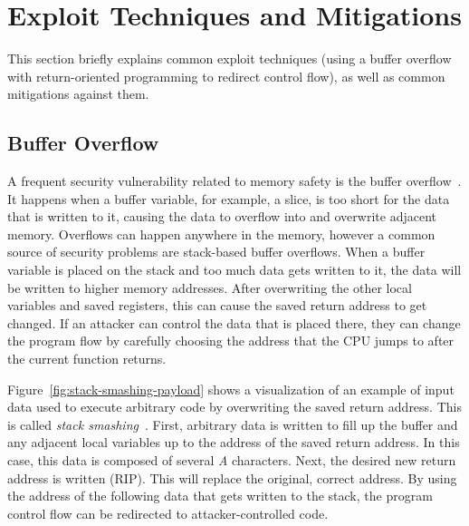 
\section{Exploit Techniques and Mitigations}\label{sec:background:exploit-techniques}

This section briefly explains common exploit techniques (using a buffer overflow with return-oriented programming to
redirect control flow), as well as common mitigations against them.



\subsection{Buffer Overflow}\label{subsec:background:exploit-techniques:buffer-overflow}

A frequent security vulnerability related to memory safety is the buffer overflow~\cite{larochelle2001}.
It happens when a buffer variable, for example, a slice, is too short for the data that is written to it, causing the
data to overflow into and overwrite adjacent memory.
Overflows can happen anywhere in the memory, however a common source of security problems are stack-based buffer
overflows.
When a buffer variable is placed on the stack and too much data gets written to it, the data will be written to higher
memory addresses.
After overwriting the other local variables and saved registers, this can cause the saved return address to get changed.
If an attacker can control the data that is placed there, they can change the program flow by carefully choosing the
address that the CPU jumps to after the current function returns.

Figure~\ref{fig:stack-smashing-payload} shows a visualization of an example of input data used to execute arbitrary code
by overwriting the saved return address.
This is called \textit{stack smashing}~\cite{smith1997}.
First, arbitrary data is written to fill up the buffer and any adjacent local variables up to the address of the
saved return address.
In this case, this data is composed of several \textit{A} characters.
Next, the desired new return address is written (\acrshort{RIP}).
This will replace the original, correct address.
By using the address of the following data that gets written to the stack, the program control flow can be redirected to
attacker-controlled code.

